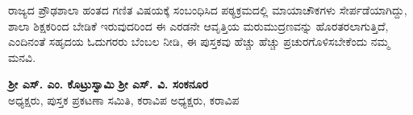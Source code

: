 ರಾಜ್ಯದ ಪ್ರೌಢಶಾಲಾ ಹಂತದ ಗಣಿತ ವಿಷಯಕ್ಕೆ ಸಂಬಂಧಿಸಿದ ಪಠ್ಯಕ್ರಮದಲ್ಲಿ ಮಾಯಾ\-ಚೌಕಗಳು ಸೇರ್ಪಡೆಯಾಗಿದ್ದು, ಶಾಲಾ ಶಿಕ್ಷಕರಿಂದ ಬೇಡಿಕೆ ಇರುವುದರಿಂದ ಈ ಎರಡನೇ ಆವೃತ್ತಿಯ ಮರುಮುದ್ರಣವನ್ನು ಹೊರತರಲಾಗುತ್ತಿದೆ, ಎಂದಿನಂತೆ ಸಹೃದಯ ಓದುಗರರು ಬೆಂಬಲ ನೀಡಿ, ಈ ಪುಸ್ತಕವು ಹೆಚ್ಚು ಹೆಚ್ಚು ಪ್ರಚುರಗೊಳಿಸಬೇಕೆಂದು ನಮ್ಮ ಮನವಿ.

\medskip

\noindent

\bigskip
\bigskip
\bigskip
\bigskip


{\bf ಶ್ರೀ ಎಸ್. ಎಂ. ಕೊಟ್ರುಸ್ವಾಮಿ }  \hfill {\bf ಶ್ರೀ ಎಸ್. ವಿ. ಸಂಕನೂರ}\\
ಅಧ್ಯಕ್ಷರು, ಪುಸ್ತಕ ಪ್ರಕಟಣಾ ಸಮಿತಿ, ಕರಾವಿಪ \hfill  ಅಧ್ಯಕ್ಷರು, ಕರಾವಿಪ



\newpage
